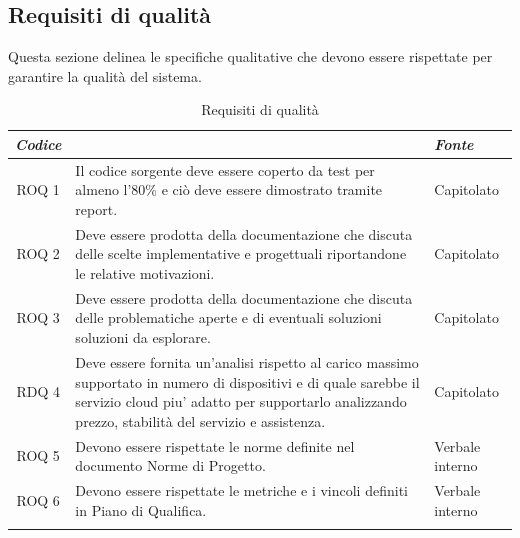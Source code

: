 \documentclass[12pt, oneside]{article}
\begin{document}
\subsection{Requisiti di qualità}
Questa sezione delinea le specifiche qualitative che devono essere rispettate per garantire la qualità del sistema.
\begin{longtable}{|c|p{14cm}|p{2cm}|}
    \hline
    \emph{Codice} & \centering{\emph{Descrizione}} &  \emph{Fonte} \\
    \hline
    \endfirsthead
    \endhead
    ROQ 1&  Il codice sorgente deve essere coperto da test per almeno l'80\% e ciò deve essere dimostrato tramite report. & Capitolato \\
    \hline
    ROQ 2 & Deve essere prodotta della documentazione che discuta delle scelte implementative e progettuali riportandone le relative motivazioni. & Capitolato \\
    \hline
    ROQ 3 & Deve essere prodotta della documentazione che discuta delle problematiche aperte e di eventuali soluzioni soluzioni da esplorare. & Capitolato \\
    \hline
    RDQ 4 & Deve essere fornita un'analisi rispetto al carico massimo supportato in numero di dispositivi e di quale sarebbe il servizio cloud piu' adatto per supportarlo analizzando prezzo, stabilità del servizio e assistenza. & Capitolato \\
    \hline
    ROQ 5 & Devono essere rispettate le norme definite nel documento Norme di Progetto. & Verbale interno \\
    \hline
    ROQ 6 & Devono essere rispettate le metriche e i vincoli definiti in Piano di Qualifica. & Verbale interno \\
    \hline
\caption{Requisiti di qualità}
\end{longtable}
    
\end{document}
